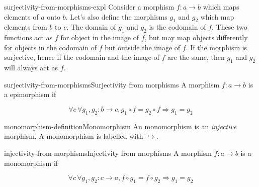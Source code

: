 \documentclass[preview]{standalone}
\begin{document}
\begin{snippet}{surjectivity-from-morphisms-expl}
    Consider a morphism \(f\colon a \rightarrow b\) which maps elements of \(a\) onto \(b\).
    Let's also define the morphisms \(g_1\) and \(g_2\) which map elements from \(b\) to \(c\).
    The domain of \(g_1\) and \(g_2\) is the codomain of \(f\). These two functions act
    as \(f\) for object in the image of \(f\), but may map objects differently
    for objects in the codomain of \(f\) but outside the image of \(f\).
    If the morphism is surjective, hence if the codomain and the image of \(f\) are the same,
    then \(g_1\) and \(g_2\) will always act as \(f\).
\end{snippet}

\begin{snippetdefinition}{surjectivity-from-morphisms}{Surjectivity from morphisms}
    A morphism \(f\colon a \rightarrow b\) is a epimorphism if

    \[
        \forall c\, \forall g_1, g_2 : b \rightarrow c, g_1 \circ f = g_2 \circ f \Rightarrow g_1 = g_2
    \]

    \begin{center}
    \end{center}
\end{snippetdefinition}

\begin{snippetdefinition}{monomorphism-definition}{Monomorphism}
    An monomorphism is an \textit{injective} morphism.
    A monomorphism is labelled with \(\hookrightarrow\).
\end{snippetdefinition}

\begin{snippetdefinition}{injectivity-from-morphisms}{Injectivity from morphisms}
    A morphism \(f\colon a \rightarrow b\) is a monomorphism if
    
    \[
        \forall c\, \forall g_1, g_2: c \rightarrow a, 
        f \circ g_1 = f \circ g_2 \Rightarrow g_1 = g_2
    \]

    \begin{center}
    \end{center}
\end{snippetdefinition}
\end{document}
